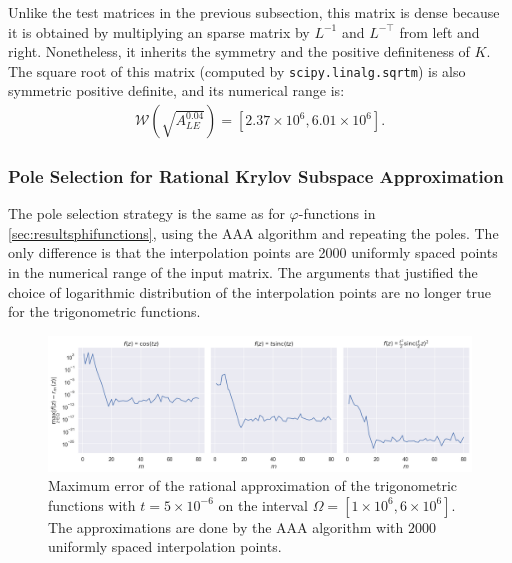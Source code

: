 Unlike the test matrices in the previous subsection, this matrix is dense because
it is obtained by multiplying an sparse matrix by $L^{-1}$ and $L^{-\top}$ from left and
right. Nonetheless, it inherits the symmetry and the positive definiteness of $K$.
The square root of this matrix (computed by \texttt{scipy.linalg.sqrtm}) is also symmetric
positive definite, and its numerical range is:
\begin{gather*}
    \mathcal{W}\left(\sqrt{A_{LE}^{0.04}}\right) = [2.37 \times 10^{6}, 6.01 \times 10^{6}].
\end{gather*}

\subsubsection*{Pole Selection for Rational Krylov Subspace Approximation}
The pole selection strategy is the same as for $\varphi$-functions in \autoref{sec:resultsphifunctions},
using the AAA algorithm and repeating the poles.
The only difference is that the interpolation points are 2000 uniformly spaced points in the
numerical range of the input matrix. The arguments that justified the choice of logarithmic
distribution of the interpolation points are no longer true for the trigonometric functions.

\begin{figure}[h]
    \centering
    \includegraphics[width=.9\textwidth]{img/trigonometric/AAA_errors_t5e-06.png}
    \caption{
        Maximum error of the rational approximation of the trigonometric functions
        with $t=5\times10^{-6}$ on the interval $\Omega = [1 \times 10^{6}, 6 \times 10^{6}]$.
        The approximations are done by the AAA algorithm with $2000$ uniformly spaced
        interpolation points.
    }
    \label{fig:trigonometricAAAerrors}
\end{figure}

